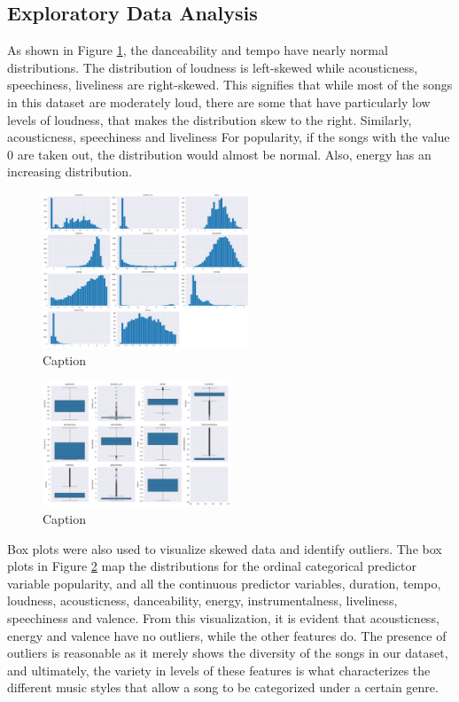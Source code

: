 \documentclass[times, twocolumn]{article}
\begin{document}
\subsection{Exploratory Data Analysis}
As shown in Figure \ref{graph:dists}, the danceability and tempo have nearly normal distributions. The distribution of loudness is left-skewed while acousticness, speechiness, liveliness are right-skewed. This signifies that while most of the songs in this dataset are moderately loud, there are some that have particularly low levels of loudness, that makes the distribution skew to the right. Similarly, acousticness, speechiness and liveliness For popularity, if the songs with the value 0 are taken out, the distribution would almost be normal. Also, energy has an increasing distribution.
\begin{figure}[H]
    \centering
    \includegraphics[width=0.55\textwidth]{feature_dists.png}
    \caption{Caption}
    \label{graph:dists}
\end{figure}

\begin{figure}[H]
    \centering
    \includegraphics[width=0.5\textwidth]{feat_boxplots.png}
    \caption{Caption}
    \label{Boxplots}
\end{figure}

Box plots were also used to visualize skewed data and identify outliers. The box plots in Figure \ref{Boxplots} map the distributions for the ordinal categorical predictor variable popularity, and all the continuous predictor variables, duration, tempo, loudness, acousticness, danceability, energy, instrumentalness, liveliness, speechiness and valence. From this visualization, it is evident that acousticness, energy and valence have no outliers, while the other features do. The presence of outliers is reasonable as it merely shows the diversity of the songs in our dataset, and ultimately, the variety in levels of these features is what characterizes the different music styles that allow a song to be categorized under a certain genre.
\end{document}

